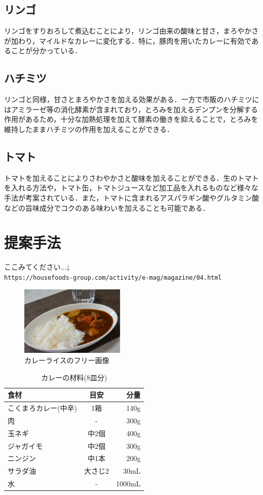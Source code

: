 \documentclass[a4paper, 11pt]{jsarticle}
\begin{document}
\subsection{リンゴ}
リンゴをすりおろして煮込むことにより，リンゴ由来の酸味と甘さ，まろやかさが加わり，マイルドなカレーに変化する．特に，豚肉を用いたカレーに有効であることが分かっている．

\subsection{ハチミツ}
リンゴと同様，甘さとまろやかさを加える効果がある．一方で市販のハチミツにはアミラーゼ等の消化酵素が含まれており，とろみを加えるデンプンを分解する作用があるため，十分な加熱処理を加えて酵素の働きを抑えることで，とろみを維持したままハチミツの作用を加えることができる．

\subsection{トマト}
トマトを加えることによりさわやかさと酸味を加えることができる．生のトマトを入れる方法や，トマト缶，トマトジュースなど加工品を入れるものなど様々な手法が考案されている．また，トマトに含まれるアスパラギン酸やグルタミン酸などの旨味成分でコクのある味わいを加えることも可能である．

\section{提案手法}
ここみてください...↓\\
\texttt{https://housefoods-group.com/activity/e-mag/magazine/04.html}

\begin{figure}[htb]
\begin{center}
\includegraphics[clip,width = 5.0cm]{curry.eps}
\end{center}
\caption{カレーライスのフリー画像}  \label{curryfig}
\end{figure}

\begin{table}[htb]
 \caption{カレーの材料(8皿分)}
 \centering
 \begin{tabular}{lcr}
 \hline
食材 & 目安 & 分量 \\
\hline\hline
こくまろカレー(中辛) & 1箱 & 140g\\
肉 & - & 300g\\
玉ネギ & 中2個 & 400g \\
ジャガイモ & 中2個 & 300g \\
ニンジン & 中1本 & 200g \\
サラダ油 & 大さじ2 & 30mL \\
水 & - & 1000mL \\
\hline
\end{tabular}
\end{table}
\end{document}
